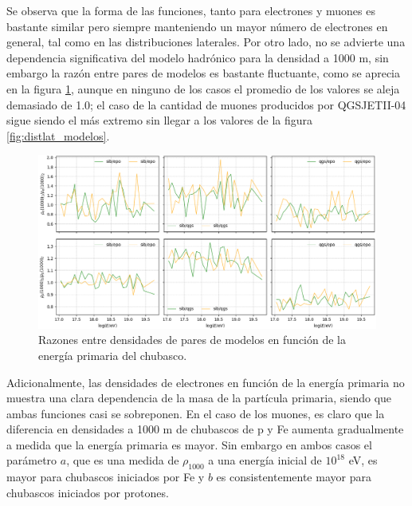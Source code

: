 Se observa que la forma de las funciones, tanto para electrones y muones es bastante similar pero siempre manteniendo un mayor número de electrones en general, tal como en las distribuciones laterales. Por otro lado, no se advierte una dependencia significativa del modelo hadrónico para la densidad a 1000 m, sin embargo la razón entre pares de modelos es bastante fluctuante, como se aprecia en la figura \ref{fig:density_modelos}, aunque en ninguno de los casos el promedio de los valores se aleja demasiado de 1.0; el caso de la cantidad de muones producidos por QGSJETII-04 sigue siendo el más extremo sin llegar a los valores de la figura \ref{fig:distlat_modelos}. \\

\begin{figure}[]
\centering
\includegraphics[width=\textwidth]{Figuras/density_models}
\caption{Razones entre densidades de pares de modelos en función de la energía primaria del chubasco.}
\label{fig:density_modelos}
\end{figure}

Adicionalmente, las densidades de electrones en función de la energía primaria no muestra una clara dependencia de la masa de la partícula primaria, siendo que ambas funciones casi se sobreponen. En el caso de los muones, es claro que la diferencia en densidades a 1000 m de chubascos de p y Fe aumenta gradualmente a medida que la energía primaria es mayor. Sin embargo en ambos casos el parámetro $a$, que es una medida de $\rho_{1000}$ a una energía inicial de $10^{18}$ eV, es mayor para chubascos iniciados por Fe y $b$ es consistentemente mayor para chubascos iniciados por protones.

\singlespacing